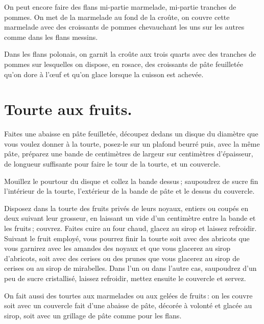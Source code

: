 On peut encore faire des flans mi-partie marmelade, mi-partie tranches de
pommes. On met de la marmelade au fond de la croûte, on couvre cette marmelade
avec des croissants de pommes chevauchant les uns sur les autres comme dans les
flans messins.

\sk

Dans les flans polonais, on garnit la croûte aux trois quarts avec des tranches
de pommes sur lesquelles on dispose, en rosace, des croissants de pâte feuilletée
qu'on dore à l'œuf et qu'on glace lorsque la cuisson est achevée.

\section*{\centering Tourte aux fruits.}
{}

Faites une abaisse en pâte feuilletée, découpez dedans un disque du diamètre
que vous voulez donner à la tourte, posez-le sur un plafond beurré puis, avec
la même pâte, préparez une bande de {\mmm} centimètres de largeur sur
{\mmm} centimètres d'épaisseur, de longueur suffisante pour faire le tour
de la tourte, et un couvercle.

Mouillez le pourtour du disque et collez la bande dessus ; saupoudrez de sucre
fin l'intérieur de la tourte, l'extérieur de la bande de pâte et le dessus du
couvercle.

Disposez dans la tourte des fruits privés de leurs noyaux, entiers ou coupés en
deux suivant leur grosseur, en laissant un vide d'un centimètre entre la bande
et les fruits ; couvrez. Faites cuire au four chaud, glacez au sirop et laissez
refroidir. Suivant le fruit employé, vous pourrez finir la tourte soit avec des
abricots que vous garnirez avec les amandes des noyaux et que vous glacerez au
sirop d'abricots, soit avec des cerises ou des prunes que vous glacerez au
sirop de cerises ou au sirop de mirabelles. Dans l'un ou dans l'autre cas,
saupoudrez d'un peu de sucre cristallisé, laissez refroidir, mettez ensuite le
couvercle et servez.

\sk

On fait aussi des tourtes aux marmelades ou aux gelées de fruits : on les
couvre soit avec un couvercle fait d'une abaisse de pâte, décorée à volonté et
glacée au sirop, soit avec un grillage de pâte comme pour les flans.

